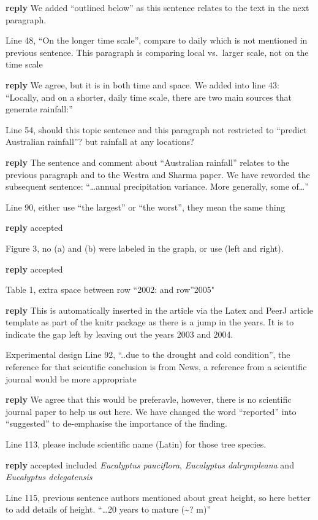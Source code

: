 \documentclass[fleqn,10pt,lineno]{wlpeerj} %
\theoremstyle{definition}
\theoremstyle{definition}
\theoremstyle{definition}
\theoremstyle{remark}
\begin{document}
\textbf{reply} We added ``outlined below'' as this sentence relates to
the text in the next paragraph.

Line 48, ``On the longer time scale'', compare to daily which is not
mentioned in previous sentence. This paragraph is comparing local
vs.~larger scale, not on the time scale

\textbf{reply} We agree, but it is in both time and space. We added into
line 43: ``Locally, and on a shorter, daily time scale, there are two
main sources that generate rainfall:''

Line 54, should this topic sentence and this paragraph not restricted to
``predict Australian rainfall''? but rainfall at any locations?

\textbf{reply} The sentence and comment about ``Australian rainfall''
relates to the previous paragraph and to the Westra and Sharma paper. We
have reworded the subsequent sentence: ``\ldots{}annual precipitation
variance. More generally, some of\ldots{}''

Line 90, either use ``the largest'' or ``the worst'', they mean the same
thing

\textbf{reply} accepted

Figure 3, no (a) and (b) were labeled in the graph, or use (left and
right).

\textbf{reply} accepted

Table 1, extra space between row ``2002: and row''2005"

\textbf{reply} This is automatically inserted in the article via the
Latex and PeerJ article template as part of the knitr package as there
is a jump in the years. It is to indicate the gap left by leaving out
the years 2003 and 2004.

Experimental design Line 92, ``..due to the drought and cold
condition'', the reference for that scientific conclusion is from News,
a reference from a scientific journal would be more appropriate

\textbf{reply} We agree that this would be preferavle, however, there is
no scientific journal paper to help us out here. We have changed the
word ``reported'' into ``suggested'' to de-emphasise the importance of
the finding.

Line 113, please include scientific name (Latin) for those tree species.

\textbf{reply} accepted included \emph{Eucalyptus pauciflora},
\emph{Eucalyptus dalrympleana} and \emph{Eucalyptus delegatensis}

Line 115, previous sentence authors mentioned about great height, so
here better to add details of height. ``\ldots{}20 years to mature
(\textasciitilde{}? m)''
\end{document}
